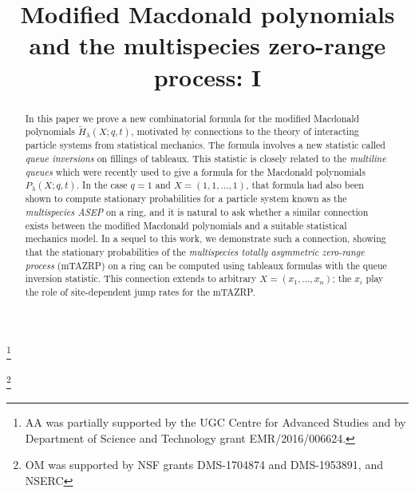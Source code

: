 \documentclass[ALCO,Unicode]{cedram}
\begin{document}
\title
[Modified Macdonald polynomials and the multispecies TAZRP: I]
{Modified Macdonald polynomials and the multispecies zero-range process: I}

\author[\initial{A} \lastname{Ayyer}]{ }
\address{Department of Mathematics\\
Indian Institute of Science\\
Bangalore 560 012, India}
\thanks{AA was partially supported by the UGC Centre for Advanced Studies and by Department of Science and Technology grant EMR/2016/006624.}

\author[\initial{O} \lastname{Mandelshtam}]{ }
\address{Department of Combinatorics and Optimization\\ 
University of Waterloo\\Waterloo, ON, Canada}
\thanks{OM was supported by NSF grants DMS-1704874 and DMS-1953891, and NSERC}




\author[\initial{J} \middlename{B} \lastname{Martin}]{  }
\address{Department of Statistics\\ University of Oxford\\ UK}







\begin{abstract}
In this paper we prove a new combinatorial formula for the modified Macdonald polynomials $\widetilde{H}_\lambda(X;q,t)$, motivated by connections to the theory of interacting particle systems from statistical mechanics. The formula involves a new statistic called \emph{queue inversions} on fillings of tableaux. This statistic is closely related to the \emph{multiline queues} which were recently used to give a formula for the Macdonald polynomials $P_\lambda(X;q,t)$. In the case $q=1$ and $X=(1,1,\dots,1)$, that formula had also been shown to compute stationary probabilities for a particle system known as the \emph{multispecies ASEP} on a ring, and it is natural to ask whether a similar connection exists between the modified Macdonald polynomials and a suitable statistical mechanics model. In a sequel to this work, we demonstrate such a connection, showing that the stationary probabilities of the \emph{multispecies totally asymmetric zero-range process} (mTAZRP) on a ring can be computed using tableaux formulas with the queue inversion statistic. This connection extends to arbitrary $X=(x_1,\dots, x_n)$; the $x_i$ play the role of site-dependent jump rates for the mTAZRP. 
\end{abstract}
\end{document}
